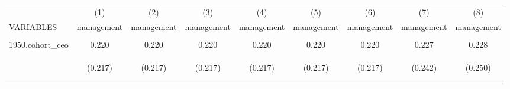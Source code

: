 \begin{center}
\begin{tabular}{lcccccccc} \hline
 & (1) & (2) & (3) & (4) & (5) & (6) & (7) & (8) \\
VARIABLES & management & management & management & management & management & management & management & management \\ \hline
\vspace{4pt} & \begin{footnotesize}\end{footnotesize} & \begin{footnotesize}\end{footnotesize} & \begin{footnotesize}\end{footnotesize} & \begin{footnotesize}\end{footnotesize} & \begin{footnotesize}\end{footnotesize} & \begin{footnotesize}\end{footnotesize} & \begin{footnotesize}\end{footnotesize} & \begin{footnotesize}\end{footnotesize} \\
1950.cohort\_ceo & 0.220 & 0.220 & 0.220 & 0.220 & 0.220 & 0.220 & 0.227 & 0.228 \\
\vspace{4pt} & \begin{footnotesize}(0.217)\end{footnotesize} & \begin{footnotesize}(0.217)\end{footnotesize} & \begin{footnotesize}(0.217)\end{footnotesize} & \begin{footnotesize}(0.217)\end{footnotesize} & \begin{footnotesize}(0.217)\end{footnotesize} & \begin{footnotesize}(0.217)\end{footnotesize} & \begin{footnotesize}(0.242)\end{footnotesize} & \begin{footnotesize}(0.250)\end{footnotesize} \\

\end{tabular}
\end{center}
